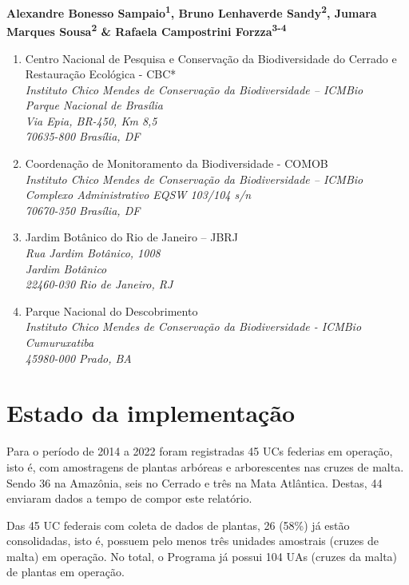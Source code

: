 \documentclass[
  letterpaper,
]{scrbook}
\begin{document}
\textbf{Alexandre Bonesso Sampaio\textsuperscript{1}, Bruno Lenhaverde
Sandy\textsuperscript{2}, Jumara Marques Sousa\textsuperscript{2} \&
Rafaela Campostrini Forzza\textsuperscript{3-4}}

\begin{enumerate}
\def\labelenumi{\arabic{enumi}.}
\item
  Centro Nacional de Pesquisa e Conservação da Biodiversidade do Cerrado
  e Restauração Ecológica - CBC*\\
  \emph{Instituto Chico Mendes de Conservação da Biodiversidade --
  ICMBio}\\
  \emph{Parque Nacional de Brasília}\\
  \emph{Via Epia, BR-450, Km 8,5}\\
  \emph{70635-800 Brasília, DF}
\item
  Coordenação de Monitoramento da Biodiversidade - COMOB\\
  \emph{Instituto Chico Mendes de Conservação da Biodiversidade --
  ICMBio}\\
  \emph{Complexo Administrativo EQSW 103/104 s/n}\\
  \emph{70670-350 Brasília, DF}
\item
  Jardim Botânico do Rio de Janeiro -- JBRJ\\
  \emph{Rua Jardim Botânico, 1008}\\
  \emph{Jardim Botânico}\\
  \emph{22460-030 Rio de Janeiro, RJ}
\item
  Parque Nacional do Descobrimento\\
  \emph{Instituto Chico Mendes de Conservação da Biodiversidade -
  ICMBio}\\
  \emph{Cumuruxatiba}\\
  \emph{45980-000 Prado, BA}
\end{enumerate}

\section{Estado da implementação}\label{estado-da-implementauxe7uxe3o}

Para o período de 2014 a 2022 foram registradas 45 UCs federias em
operação, isto é, com amostragens de plantas arbóreas e arborescentes
nas cruzes de malta. Sendo 36 na Amazônia, seis no Cerrado e três na
Mata Atlântica. Destas, 44 enviaram dados a tempo de compor este
relatório.

Das 45 UC federais com coleta de dados de plantas, 26 (58\%) já estão
consolidadas, isto é, possuem pelo menos três unidades amostrais (cruzes
de malta) em operação. No total, o Programa já possui 104 UAs (cruzes da
malta) de plantas em operação.
\end{document}

